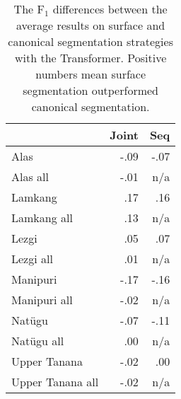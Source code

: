 \begin{table}[!tb]
    \centering
    \begin{tabular}{l|r|r}
          & \textbf{Joint} & \textbf{Seq} \\
         \hline
         Alas  & -.09 &  -.07  \\
         Alas all & -.01 & n/a \\
         \hline
         Lamkang  & .17 & .16  \\
         Lamkang all & .13 & n/a \\
         \hline
         Lezgi  & .05 & .07  \\
         Lezgi all & .01 & n/a \\
         \hline
         Manipuri  & -.17 & -.16   \\
         Manipuri all & -.02 & n/a \\
         \hline
         Natügu  & -.07 & -.11  \\
         Natügu all & .00 & n/a \\
         \hline
         Upper Tanana & -.02 & .00 \\
         Upper Tanana all & -.02 & n/a \\
    \end{tabular}
    \caption[F$_1$-score Differences between Surface and Canonical Segmentation]{The F$_1$ differences between the average results on surface and canonical segmentation strategies with the Transformer. Positive numbers mean surface segmentation outperformed canonical segmentation.}
    \label{tab:segdiffresults}
\end{table}


